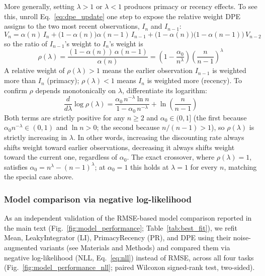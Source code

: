 \documentclass[12pt]{article}
\begin{document}
More generally, setting $\lambda>1$ or $\lambda<1$ produces primacy or recency effects. To see this, unroll Eq.~\ref{eq:dpe_update} one step to expose the relative weight DPE assigns to the two most recent observations, $I_n$ and $I_{n-1}$:
\begin{equation}
V_n = \alpha(n)\,I_n + \bigl(1-\alpha(n)\bigr)\alpha(n-1)\,I_{n-1} + \bigl(1-\alpha(n)\bigr)\bigl(1-\alpha(n-1)\bigr)\,V_{n-2}
\end{equation}
so the ratio of $I_{n-1}$'s weight to $I_n$'s weight is
\begin{equation}
\rho(\lambda) = \frac{(1-\alpha(n))\,\alpha(n-1)}{\alpha(n)} = \left(1-\frac{\alpha_0}{n^\lambda}\right)\left(\frac{n}{n-1}\right)^{\lambda}
\end{equation}
A relative weight of $\rho(\lambda)>1$ means the earlier observation $I_{n-1}$ is weighted more than $I_n$ (primacy); $\rho(\lambda)<1$ means $I_n$ is weighted more (recency). To confirm $\rho$ depends monotonically on $\lambda$, differentiate its logarithm:
\begin{equation}
\frac{d}{d\lambda}\log \rho(\lambda) = \frac{\alpha_0\,n^{-\lambda}\ln n}{1-\alpha_0\,n^{-\lambda}} + \ln\!\left(\frac{n}{n-1}\right)
\end{equation}
Both terms are strictly positive for any $n\geq2$ and $\alpha_0\in(0,1]$ (the first because $\alpha_0 n^{-\lambda}\in(0,1)$ and $\ln n>0$; the second because $n/(n-1)>1$), so $\rho(\lambda)$ is strictly increasing in $\lambda$. In other words, increasing the discounting rate always shifts weight toward earlier observations, decreasing it always shifts weight toward the current one, regardless of $\alpha_0$. The exact crossover, where $\rho(\lambda)=1$, satisfies $\alpha_0 = n^\lambda - (n-1)^\lambda$; at $\alpha_0=1$ this holds at $\lambda=1$ for every $n$, matching the special case above.

\subsubsection*{Model comparison via negative log-likelihood}
As an independent validation of the RMSE-based model comparison reported in the main text (Fig.~\ref{fig:model_performance}; Table~\ref{tab:best_fit}), we refit Mean, LeakyIntegrator (LI), PrimacyRecency (PR), and DPE using their noise-augmented variants (see Materials and Methods) and compared them via negative log-likelihood (NLL, Eq.~\ref{eq:nll}) instead of RMSE, across all four tasks (Fig.~\ref{fig:model_performance_nll}; paired Wilcoxon signed-rank test, two-sided).
\end{document}
